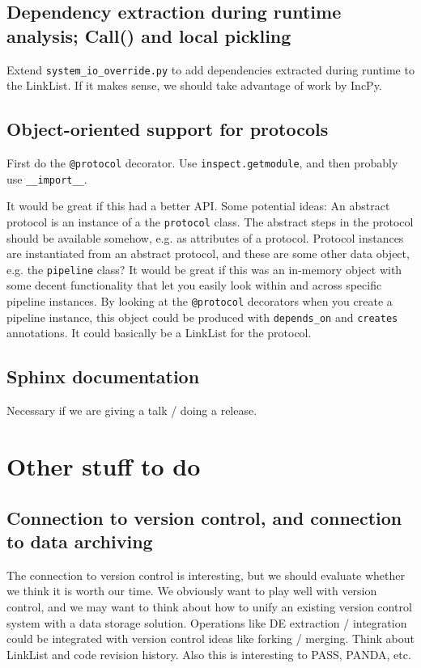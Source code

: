 \documentclass[11pt]{article}
\newcommand{\noi}{\noindent}
\begin{document}
\subsection{Dependency extraction during runtime analysis; Call() and local pickling}

Extend \verb|system_io_override.py| to add dependencies extracted during runtime to the LinkList.
If it makes sense, we should take advantage of work by IncPy. 


\subsection{Object-oriented support for protocols}

First do the \verb|@protocol| decorator.  
Use \verb|inspect.getmodule|, and then probably use \verb|__import__|.

\noi It would be great if this had a better API.  Some potential ideas:  
An abstract protocol is an instance of a the \verb|protocol| class.  The abstract steps in the 
protocol should be available somehow, e.g. as attributes of a protocol.  Protocol instances are
instantiated from an abstract protocol, and these are some other data object, e.g. the 
\verb|pipeline| class? It would be great if this was an in-memory object with some decent 
functionality that let you easily look within and across specific pipeline instances.
By looking at the \verb|@protocol| decorators when you create a pipeline instance, this object 
could be produced with \verb|depends_on| and \verb|creates| annotations.  It could basically be a 
LinkList for the protocol.  


\subsection{Sphinx documentation}
Necessary if we are giving a talk / doing a release.
	

\section{Other stuff to do}

\subsection{Connection to version control, and connection to data archiving}

The connection to version control is interesting, but we should evaluate whether we think it is
worth our time.  We obviously want to play well with version control, and we may want to think about
how to unify an existing version control system with a data storage solution.  Operations like
DE extraction / integration could be integrated with version control ideas like forking / merging.
Think about LinkList and code revision history.  Also this is interesting to PASS, PANDA, etc.
\end{document}
